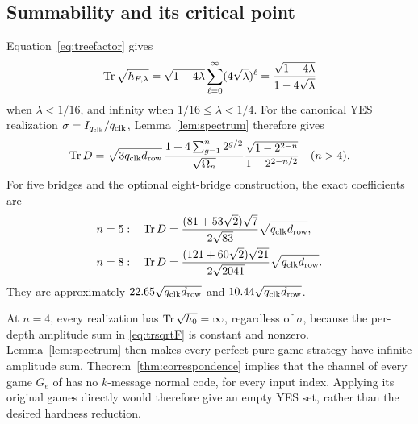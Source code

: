 \subsection{Summability and its critical point}
Equation~\eqref{eq:treefactor} gives
\begin{equation}\label{eq:trsqrtF}
 \operatorname{Tr}\sqrt{h_{F,\lambda}}
 =\sqrt{1-4\lambda}\sum_{\ell=0}^\infty(4\sqrt\lambda)^\ell
 =\frac{\sqrt{1-4\lambda}}{1-4\sqrt\lambda}
\end{equation}
when $\lambda<1/16$, and infinity when $1/16\leq\lambda<1/4$.
For the canonical YES realization $\sigma=I_{q_{\mathrm{clk}}}/q_{\mathrm{clk}}$, Lemma~\ref{lem:spectrum} therefore gives
\begin{equation}\label{eq:YESsum}
 \operatorname{Tr} D=\sqrt{3q_{\mathrm{clk}}d_{\mathrm{row}}}\,
 \frac{1+4\sum_{g=1}^n2^{g/2}}{\sqrt{\Omega_n}}
 \frac{\sqrt{1-2^{2-n}}}{1-2^{2-n/2}}\quad(n>4).
\end{equation}
For five bridges and the optional eight-bridge construction, the exact coefficients are
\begin{align}
 n=5:&\quad \operatorname{Tr} D=\frac{(81+53\sqrt2)\sqrt7}{2\sqrt{83}}\sqrt{q_{\mathrm{clk}}d_{\mathrm{row}}},\label{eq:fiveconstant}\\
 n=8:&\quad \operatorname{Tr} D=\frac{(121+60\sqrt2)\sqrt{21}}{2\sqrt{2041}}\sqrt{q_{\mathrm{clk}}d_{\mathrm{row}}}.\label{eq:eightconstant}
\end{align}
They are approximately $22.65\sqrt{q_{\mathrm{clk}}d_{\mathrm{row}}}$ and $10.44\sqrt{q_{\mathrm{clk}}d_{\mathrm{row}}}$.

\begin{remark}\label{rem:critical}
At $n=4$, every realization has $\operatorname{Tr}\sqrt{h_0}=\infty$, regardless of $\sigma$, because the per-depth amplitude sum in \eqref{eq:trsqrtF} is constant and nonzero. Lemma~\ref{lem:spectrum} then makes every perfect pure game strategy have infinite amplitude sum. Theorem~\ref{thm:correspondence} implies that the channel of every game $G_e$ of \cite[Theorem~7.1]{Sigma2} has no $k$-message normal code, for every input index. Applying its original games directly would therefore give an empty YES set, rather than the desired hardness reduction.
\end{remark}
